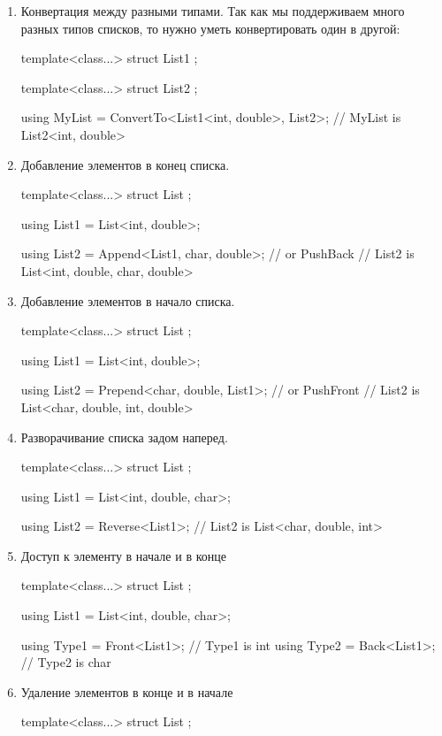 \begin{enumerate}
\item Конвертация между разными типами.
Так как мы поддерживаем много разных типов списков, то нужно уметь конвертировать один в другой:
\begin{cppcode}
template<class...>
struct List1 {};

template<class...>
struct List2 {};

using MyList = ConvertTo<List1<int, double>, List2>;
// MyList is List2<int, double>
\end{cppcode}

\item Добавление элементов в конец списка.
\begin{cppcode}
template<class...>
struct List {};

using List1 = List<int, double>;

using List2 = Append<List1, char, double>; // or PushBack
// List2 is List<int, double, char, double>
\end{cppcode}

\item Добавление элементов в начало списка.
\begin{cppcode}
template<class...>
struct List {};

using List1 = List<int, double>;

using List2 = Prepend<char, double, List1>; // or PushFront
// List2 is List<char, double, int, double>
\end{cppcode}

\item Разворачивание списка задом наперед.
\begin{cppcode}
template<class...>
struct List {};

using List1 = List<int, double, char>;

using List2 = Reverse<List1>;
// List2 is List<char, double, int>
\end{cppcode}

\item Доступ к элементу в начале и в конце
\begin{cppcode}
template<class...>
struct List {};

using List1 = List<int, double, char>;

using Type1 = Front<List1>;
// Type1 is int
using Type2 = Back<List1>;
// Type2 is char
\end{cppcode}

\item Удаление элементов в конце и в начале
\begin{cppcode}
template<class...>
struct List {};


\end{cppcode}
\end{enumerate}

